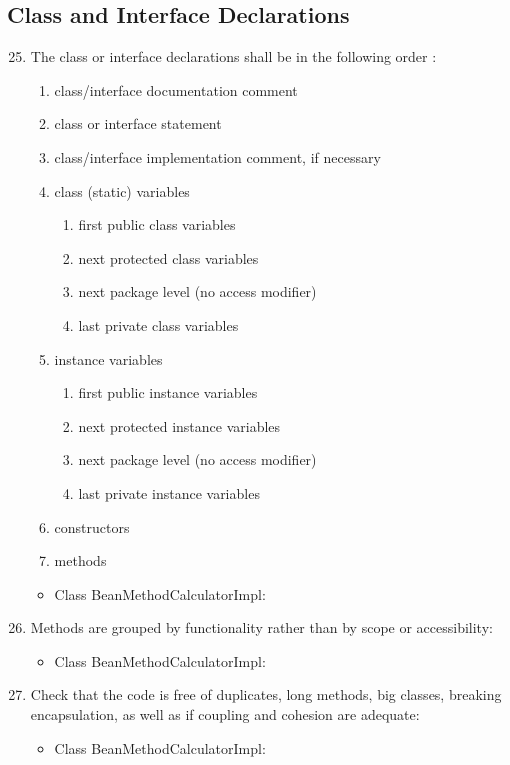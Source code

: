 \subsection{Class and Interface Declarations}
\begin{enumerate}
	\setcounter{enumi}{24}
	\item The class or interface declarations shall be in the following order :
	\begin{enumerate}[label=\Alph*.]
		\item class/interface documentation comment
		\item class or interface statement
		\item class/interface implementation comment, if necessary
		\item class (static) variables
		\begin{enumerate}[label=\alph*.]
			\item first public class variables
			\item next protected class variables
			\item next package level (no access modifier)
			\item last private class variables
		\end{enumerate}
		\item instance variables
		\begin{enumerate}[label=\alph*.]
			\item first public instance variables
			\item next protected instance variables
			\item next package level (no access modifier)
			\item last private instance variables
		\end{enumerate}
		\item constructors
		\item methods
	\end{enumerate}
	\begin{itemize}
		\item Class BeanMethodCalculatorImpl: \cmark
	\end{itemize}
	\item Methods are grouped by functionality rather than by scope or accessibility:
	\begin{itemize}
		\item Class BeanMethodCalculatorImpl: \cmark
	\end{itemize}
	\item Check that the code is free of duplicates, long methods, big classes, breaking encapsulation, as well as if coupling and cohesion are adequate:
	\begin{itemize}
		\item Class BeanMethodCalculatorImpl: \cmark
	\end{itemize}
\end{enumerate}